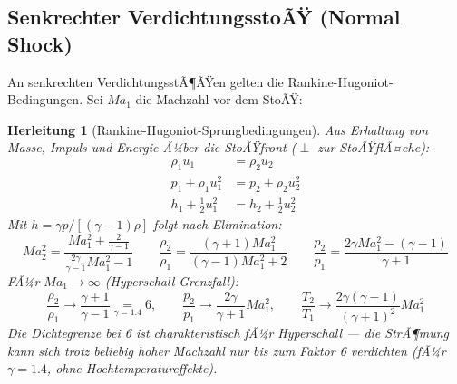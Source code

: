 ﻿\documentclass[12pt,a4paper]{article}
\newtheorem{herleitung}{Herleitung}[section]
\newcommand{\Ma}{M\!a}
\begin{document}
\subsection{Senkrechter VerdichtungsstoÃŸ (Normal Shock)}

An senkrechten VerdichtungsstÃ¶ÃŸen gelten die Rankine-Hugoniot-Bedingungen.
Sei $\Ma_1$ die Machzahl vor dem StoÃŸ:

\begin{herleitung}[Rankine-Hugoniot-Sprungbedingungen]
Aus Erhaltung von Masse, Impuls und Energie Ã¼ber die StoÃŸfront ($\perp$ zur StoÃŸflÃ¤che):
\begin{align*}
  \rho_1 u_1 &= \rho_2 u_2 \tag{Masse}\\
  p_1 + \rho_1 u_1^2 &= p_2 + \rho_2 u_2^2 \tag{Impuls}\\
  h_1 + \tfrac{1}{2}u_1^2 &= h_2 + \tfrac{1}{2}u_2^2 \tag{Energie}
\end{align*}
Mit $h = \gamma p / [(\gamma-1)\rho]$ folgt nach Elimination:
\[
  \boxed{\Ma_2^2 = \frac{\Ma_1^2 + \frac{2}{\gamma-1}}{\frac{2\gamma}{\gamma-1}\Ma_1^2 - 1}}
  \qquad
  \frac{\rho_2}{\rho_1} = \frac{(\gamma+1)\Ma_1^2}{(\gamma-1)\Ma_1^2 + 2}
  \qquad
  \frac{p_2}{p_1} = \frac{2\gamma\Ma_1^2 - (\gamma-1)}{\gamma+1}
\]
FÃ¼r $\Ma_1 \to \infty$ (Hyperschall-Grenzfall):
\[
  \frac{\rho_2}{\rho_1} \to \frac{\gamma+1}{\gamma-1}
    \underset{\gamma=1.4}{=} 6, \qquad
  \frac{p_2}{p_1} \to \frac{2\gamma}{\gamma+1}\Ma_1^2, \qquad
  \frac{T_2}{T_1} \to \frac{2\gamma(\gamma-1)}{(\gamma+1)^2}\Ma_1^2
\]
Die \emph{Dichtegrenze} bei 6 ist charakteristisch fÃ¼r Hyperschall --- die
StrÃ¶mung kann sich trotz beliebig hoher Machzahl nur bis zum Faktor 6 verdichten
(fÃ¼r $\gamma = 1.4$, ohne Hochtemperatureffekte).
\end{herleitung}
\end{document}

